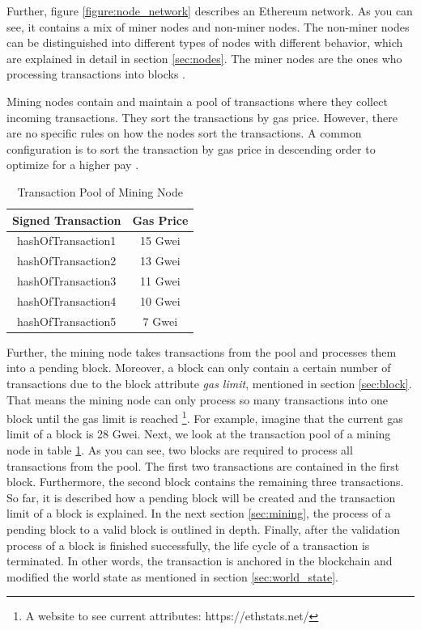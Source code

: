 Further, figure \ref{figure:node_network} describes an Ethereum network. 
As you can see, it contains a mix of miner nodes and non-miner nodes. 
The non-miner nodes can be distinguished into different types of nodes with different 
behavior, which are explained in detail in section \ref{sec:nodes}. 
The miner nodes are the ones who processing transactions into blocks . 

Mining nodes contain and maintain a pool of transactions where they collect incoming transactions. 
They sort the transactions by gas price. 
However, there are no specific rules on how the nodes sort the transactions. 
A common configuration is to sort the transaction by gas price in descending order to 
optimize for a higher pay .

\begin{longtable}{c|c}
	\caption{Transaction Pool of Mining Node} 
	\label{table:sorted_gas_prices}
	\\
	\textbf{Signed Transaction} & \textbf{Gas Price} \\
	\hline
	hashOfTransaction1 & 15 Gwei \\
	hashOfTransaction2 & 13 Gwei \\
	hashOfTransaction3 & 11 Gwei \\
	hashOfTransaction4 & 10 Gwei \\
	hashOfTransaction5 & 7 Gwei \\
\end{longtable} 

Further, the mining node takes transactions from the pool and processes them into a pending block. 
Moreover, a block can only contain a certain number of transactions due to the block 
attribute \textit{gas limit}, mentioned in section \ref{sec:block}. 
That means the mining node can only process so many transactions into one 
block until the gas limit is reached \footnote{A website to see 
current attributes: https://ethstats.net/}. For example, 
imagine that the current gas limit of a block is 28 Gwei. 
Next, we look at the transaction pool of a mining node in 
table \ref{table:sorted_gas_prices}. As you can see, two blocks are 
required to process all transactions from the pool. The first two transactions 
are contained in the first block. Furthermore, the second block contains the remaining 
three transactions. 
So far, it is described how a pending block will be created and the transaction 
limit of a block is explained. In the next section \ref{sec:mining}, 
the process of a pending block to a valid block is outlined in depth. 
Finally, after the validation process of a block is finished successfully, 
the life cycle of a transaction is terminated. In other words, the transaction is anchored 
in the blockchain and modified the world state as mentioned in section \ref{sec:world_state}.

